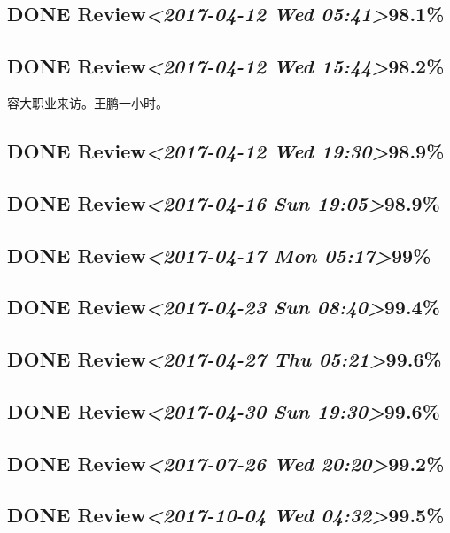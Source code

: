\documentclass[11pt]{ctexart}
\begin{document}
\subsection{{\bfseries\sffamily DONE} Review\textit{<2017-04-12 Wed 05:41>}98.1\%}
\label{sec:orgb247755}
\subsection{{\bfseries\sffamily DONE} Review\textit{<2017-04-12 Wed 15:44>}98.2\%}
\label{sec:org05a793c}
容大职业来访。王鹏一小时。
\subsection{{\bfseries\sffamily DONE} Review\textit{<2017-04-12 Wed 19:30>}98.9\%}
\label{sec:orgac93b40}
\subsection{{\bfseries\sffamily DONE} Review\textit{<2017-04-16 Sun 19:05>}98.9\%}
\label{sec:orgfdf13a8}
\subsection{{\bfseries\sffamily DONE} Review\textit{<2017-04-17 Mon 05:17>}99\%}
\label{sec:org085a290}
\subsection{{\bfseries\sffamily DONE} Review\textit{<2017-04-23 Sun 08:40>}99.4\%}
\label{sec:org72f86db}
\subsection{{\bfseries\sffamily DONE} Review\textit{<2017-04-27 Thu 05:21>}99.6\%}
\label{sec:orgc1388b4}
\subsection{{\bfseries\sffamily DONE} Review\textit{<2017-04-30 Sun 19:30>}99.6\%}
\label{sec:org16198d6}
\subsection{{\bfseries\sffamily DONE} Review\textit{<2017-07-26 Wed 20:20>}99.2\%}
\label{sec:orgd1d0ece}
\subsection{{\bfseries\sffamily DONE} Review\textit{<2017-10-04 Wed 04:32>}99.5\%}
\label{sec:org5d1bad0}
\end{document}

